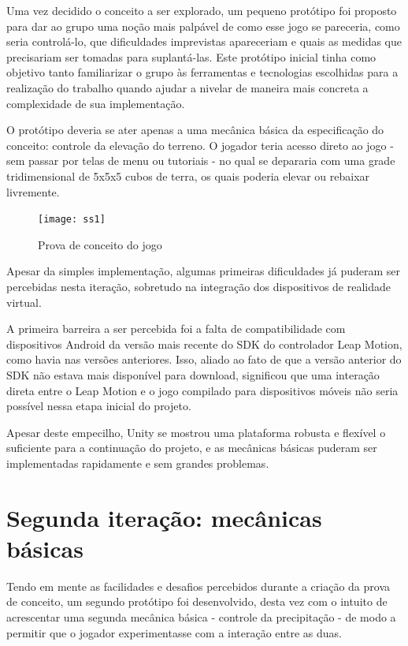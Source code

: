 Uma vez decidido o conceito a ser explorado, um pequeno protótipo foi proposto para dar ao grupo uma noção mais palpável de como esse jogo se pareceria, como seria controlá-lo, que dificuldades imprevistas apareceriam e quais as medidas que precisariam ser tomadas para suplantá-las. Este protótipo inicial tinha como objetivo tanto familiarizar o grupo às ferramentas e tecnologias escolhidas para a realização do trabalho quando ajudar a nivelar de maneira mais concreta a complexidade de sua implementação.

O protótipo deveria se ater apenas a uma mecânica básica da especificação do conceito: controle da elevação do terreno. O jogador teria acesso direto ao jogo - sem passar por telas de menu ou tutoriais - no qual se depararia com uma grade tridimensional de 5x5x5 cubos de terra, os quais poderia elevar ou rebaixar livremente.

\begin{figure}[h]
	\centering
	\texttt{[image: ss1]}
	\caption{Prova de conceito do jogo}
\end{figure}

Apesar da simples implementação, algumas  primeiras dificuldades já puderam ser percebidas nesta iteração, sobretudo na integração dos dispositivos de realidade virtual.

A primeira barreira a ser percebida foi a falta de compatibilidade com dispositivos Android da versão mais recente do SDK do controlador Leap Motion, como havia nas versões anteriores. Isso, aliado ao fato de que a versão anterior do SDK não estava mais disponível para download, significou que uma interação direta entre o Leap Motion e o jogo compilado para dispositivos móveis não seria possível nessa etapa inicial do projeto.

Apesar deste empecilho, Unity se mostrou uma plataforma robusta e flexível o suficiente para a continuação do projeto, e as mecânicas básicas puderam ser implementadas rapidamente e sem grandes problemas.

\section{Segunda iteração: mecânicas básicas}\label{sec-segunda-iteracao-mecanicas-basicas}

Tendo em mente as facilidades e desafios percebidos durante a criação da prova de conceito, um segundo protótipo foi desenvolvido, desta vez com o intuito de acrescentar uma segunda mecânica básica - controle da precipitação - de modo a permitir que o jogador experimentasse com a interação entre as duas.

